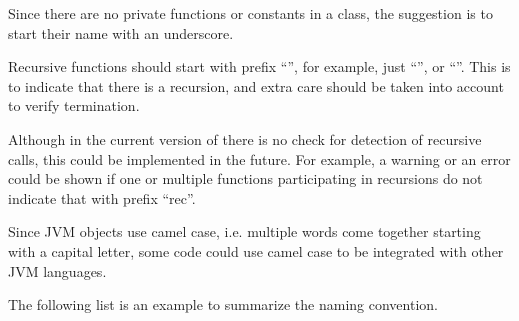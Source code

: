 Since there are no private functions or constants in a class, the suggestion is to start their name with an underscore.

Recursive functions should start with prefix ``'', for example, just ``'', or ``''.
This is to indicate that there is a recursion, and extra care should be taken into account to verify termination.

Although in the current version of \Soda there is no check for detection of recursive calls, this could be implemented in the future.
For example, a warning or an error could be shown if one or multiple functions participating in recursions do not indicate that with prefix ``rec''.

Since JVM objects use camel case, i.e. multiple words come together starting with a capital letter,
some \Soda code could use camel case to be integrated with other JVM languages.

The following list is an example to summarize the naming convention.


